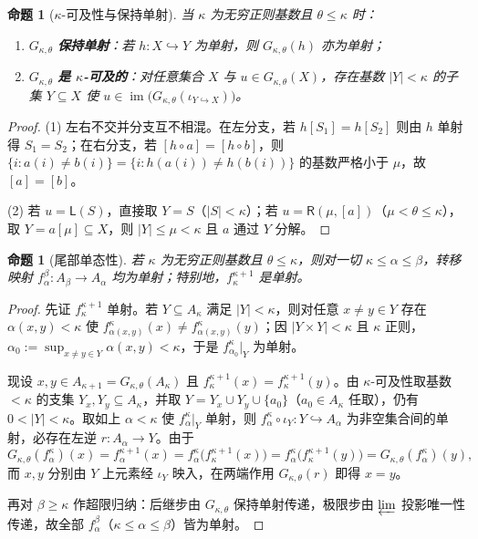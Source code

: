 \documentclass[11pt,a4paper]{ctexart}
\theoremstyle{definition}
\theoremstyle{plain}
\newtheorem{proposition}[definition]{命题}
\newcommand{\im}{\operatorname{im}}
\begin{document}
\begin{proposition}[$\kappa$-可及性与保持单射]
当 $\kappa$ 为无穷正则基数且 $\theta \le \kappa$ 时：
\begin{enumerate}[label=(\arabic*)]
  \item $G_{\kappa,\theta}$ \textbf{保持单射}：若 $h : X \hookrightarrow Y$ 为单射，则 $G_{\kappa,\theta}(h)$ 亦为单射；
  \item $G_{\kappa,\theta}$ \textbf{是 $\kappa$-可及的}：对任意集合 $X$ 与 $u \in G_{\kappa,\theta}(X)$，存在基数 $|Y| < \kappa$ 的子集 $Y \subseteq X$ 使 $u \in \im\bigl(G_{\kappa,\theta}(\iota_{Y \hookrightarrow X})\bigr)$。
\end{enumerate}
\end{proposition}

\begin{proof}
(1) 左右不交并分支互不相混。在左分支，若 $h[S_1] = h[S_2]$ 则由 $h$ 单射得 $S_1 = S_2$；在右分支，若 $[h \circ a] = [h \circ b]$，则 $\{ i : a(i) \neq b(i) \} = \{ i : h(a(i)) \neq h(b(i)) \}$ 的基数严格小于 $\mu$，故 $[a] = [b]$。

(2) 若 $u = \mathsf{L}(S)$，直接取 $Y = S$（$|S| < \kappa$）；若 $u = \mathsf{R}(\mu, [a])$（$\mu < \theta \le \kappa$），取 $Y = a[\mu] \subseteq X$，则 $|Y| \le \mu < \kappa$ 且 $a$ 通过 $Y$ 分解。
\end{proof}

\begin{proposition}[尾部单态性]
若 $\kappa$ 为无穷正则基数且 $\theta \le \kappa$，则对一切 $\kappa \le \alpha \le \beta$，转移映射 $f_\alpha^\beta : A_\beta \to A_\alpha$ 均为单射；特别地，$f_\kappa^{\kappa+1}$ 是单射。
\end{proposition}

\begin{proof}
先证 $f_\kappa^{\kappa+1}$ 单射。若 $Y \subseteq A_\kappa$ 满足 $|Y| < \kappa$，则对任意 $x \neq y \in Y$ 存在 $\alpha(x,y) < \kappa$ 使 $f_{\alpha(x,y)}^\kappa(x) \neq f_{\alpha(x,y)}^\kappa(y)$；因 $|Y \times Y| < \kappa$ 且 $\kappa$ 正则，$\alpha_0 := \sup_{x \neq y \in Y} \alpha(x,y) < \kappa$，于是 $f_{\alpha_0}^\kappa|_Y$ 为单射。

现设 $x, y \in A_{\kappa+1} = G_{\kappa,\theta}(A_\kappa)$ 且 $f_\kappa^{\kappa+1}(x) = f_\kappa^{\kappa+1}(y)$。由 $\kappa$-可及性取基数 $< \kappa$ 的支集 $Y_x, Y_y \subseteq A_\kappa$，并取 $Y = Y_x \cup Y_y \cup \{a_0\}$（$a_0 \in A_\kappa$ 任取），仍有 $0 < |Y| < \kappa$。取如上 $\alpha < \kappa$ 使 $f_\alpha^\kappa|_Y$ 单射，则 $f_\alpha^\kappa \circ \iota_Y : Y \hookrightarrow A_\alpha$ 为非空集合间的单射，必存在左逆 $r : A_\alpha \to Y$。由于
\[
  G_{\kappa,\theta}(f_\alpha^\kappa)(x) = f_\alpha^{\kappa+1}(x) = f_\alpha^\kappa\bigl(f_\kappa^{\kappa+1}(x)\bigr) = f_\alpha^\kappa\bigl(f_\kappa^{\kappa+1}(y)\bigr) = G_{\kappa,\theta}(f_\alpha^\kappa)(y),
\]
而 $x, y$ 分别由 $Y$ 上元素经 $\iota_Y$ 映入，在两端作用 $G_{\kappa,\theta}(r)$ 即得 $x = y$。

再对 $\beta \ge \kappa$ 作超限归纳：后继步由 $G_{\kappa,\theta}$ 保持单射传递，极限步由 $\varprojlim$ 投影唯一性传递，故全部 $f_\alpha^\beta$（$\kappa \le \alpha \le \beta$）皆为单射。
\end{proof}
\end{document}

